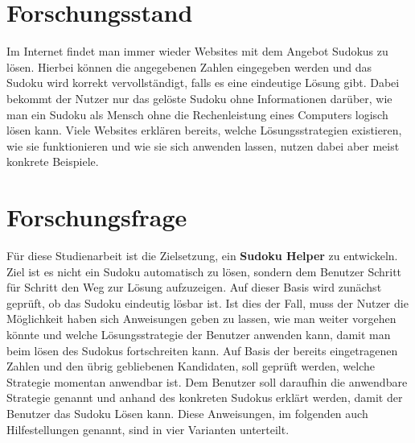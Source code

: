 \section{Forschungsstand}
Im Internet findet man immer wieder Websites mit dem Angebot Sudokus zu lösen. Hierbei können die angegebenen Zahlen eingegeben werden und das Sudoku wird korrekt vervollständigt, falls es eine eindeutige Lösung gibt. Dabei bekommt der Nutzer nur das gelöste Sudoku ohne Informationen darüber, wie man ein Sudoku als Mensch ohne die Rechenleistung eines Computers logisch lösen kann. Viele Websites erklären bereits, welche Lösungsstrategien existieren, wie sie funktionieren und wie sie sich anwenden lassen, nutzen dabei aber meist konkrete Beispiele.



\section{Forschungsfrage}
Für diese Studienarbeit ist die Zielsetzung, ein \textbf{Sudoku Helper} zu entwickeln. Ziel ist es nicht ein Sudoku automatisch zu lösen, sondern dem Benutzer Schritt für Schritt den Weg zur Lösung aufzuzeigen. Auf dieser Basis wird zunächst geprüft, ob das Sudoku eindeutig lösbar ist. Ist dies der Fall, muss der Nutzer die Möglichkeit haben sich Anweisungen geben zu lassen, wie man weiter vorgehen könnte und welche Lösungsstrategie der Benutzer anwenden kann, damit man beim lösen des Sudokus fortschreiten kann. Auf Basis der bereits eingetragenen Zahlen und den übrig gebliebenen Kandidaten, soll geprüft werden, welche Strategie momentan anwendbar ist. Dem Benutzer soll daraufhin die anwendbare Strategie genannt und anhand des konkreten Sudokus erklärt werden, damit der Benutzer das Sudoku Lösen kann. Diese Anweisungen, im folgenden auch Hilfestellungen genannt, sind in vier Varianten unterteilt.

